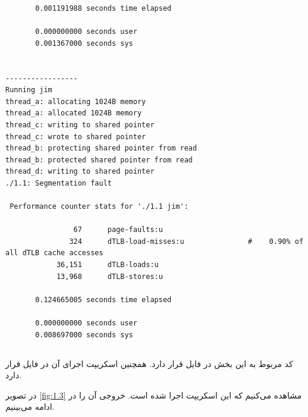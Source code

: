 \documentclass{article}
\begin{document}
\begin{latin}
\begin{lstlisting}
       0.001191988 seconds time elapsed

       0.000000000 seconds user
       0.001367000 seconds sys


-----------------
Running jim
thread_a: allocating 1024B memory
thread_a: allocated 1024B memory
thread_c: writing to shared pointer
thread_c: wrote to shared pointer
thread_b: protecting shared pointer from read
thread_b: protected shared pointer from read
thread_d: writing to shared pointer
./1.1: Segmentation fault

 Performance counter stats for './1.1 jim':

                67      page-faults:u                                                         
               324      dTLB-load-misses:u               #    0.90% of all dTLB cache accesses
            36,151      dTLB-loads:u                                                          
            13,968      dTLB-stores:u                                                         

       0.124665005 seconds time elapsed

       0.000000000 seconds user
       0.008697000 seconds sys
\end{lstlisting}
\end{latin}

\subsubsection{}
\subsubsection{}
\subsubsection{}
\subsection{}
\subsection{}
\subsubsection{}
کد مربوط به این بخش در فایل 
قرار دارد. همچنین اسکریپت اجرای آن در فایل 
قرار دارد.

در تصویر 
\ref{fig:1.3}
مشاهده می‌کنیم که این اسکریپت اجرا شده است. 
خروجی آن را در ادامه می‌بینیم. 
\end{document}
